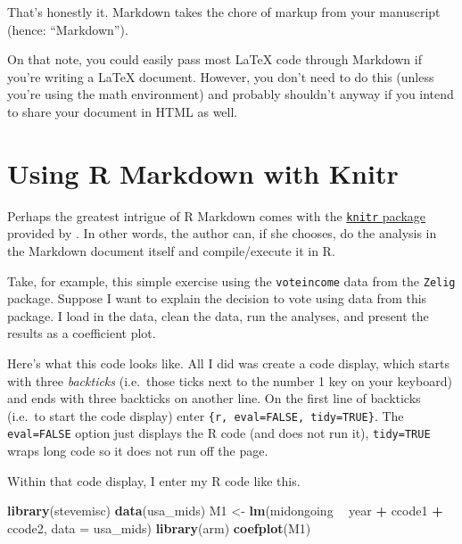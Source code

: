 \documentclass[11pt,]{article}
\newenvironment{Shaded}{\begin{snugshade}}{\end{snugshade}}
\newcommand{\DataTypeTok}[1]{\textcolor[rgb]{0.13,0.29,0.53}{#1}}
\newcommand{\KeywordTok}[1]{\textcolor[rgb]{0.13,0.29,0.53}{\textbf{#1}}}
\newcommand{\NormalTok}[1]{#1}
\newcommand{\OperatorTok}[1]{\textcolor[rgb]{0.81,0.36,0.00}{\textbf{#1}}}
\newcommand{\StringTok}[1]{\textcolor[rgb]{0.31,0.60,0.02}{#1}}
\begin{document}
That's honestly it. Markdown takes the chore of markup from your
manuscript (hence: ``Markdown'').

On that note, you could easily pass most LaTeX code through Markdown if
you're writing a LaTeX document. However, you don't need to do this
(unless you're using the math environment) and probably shouldn't anyway
if you intend to share your document in HTML as well.

\hypertarget{using-r-markdown-with-knitr}{%
\section{Using R Markdown with
Knitr}\label{using-r-markdown-with-knitr}}

Perhaps the greatest intrigue of R Markdown comes with the
\href{http://yihui.name/knitr/}{\texttt{knitr} package} provided by
\citet{xie2013ddrk}. In other words, the author can, if she chooses, do
the analysis in the Markdown document itself and compile/execute it in
R.

Take, for example, this simple exercise using the \texttt{voteincome}
data from the \texttt{Zelig} package. Suppose I want to explain the
decision to vote using data from this package. I load in the data, clean
the data, run the analyses, and present the results as a coefficient
plot.

Here's what this code looks like. All I did was create a code display,
which starts with three \emph{backticks} (i.e.~those ticks next to the
number 1 key on your keyboard) and ends with three backticks on another
line. On the first line of backticks (i.e.~to start the code display)
enter \texttt{\{r,\ eval=FALSE,\ tidy=TRUE\}}. The \texttt{eval=FALSE}
option just displays the R code (and does not run it),
\texttt{tidy=TRUE} wraps long code so it does not run off the page.

Within that code display, I enter my R code like this.

\begin{Shaded}
\begin{Highlighting}[]
\KeywordTok{library}\NormalTok{(stevemisc)}
\KeywordTok{data}\NormalTok{(usa_mids)}
\NormalTok{M1 <-}\StringTok{ }\KeywordTok{lm}\NormalTok{(midongoing }\OperatorTok{~}\StringTok{ }\NormalTok{year }\OperatorTok{+}\StringTok{ }\NormalTok{ccode1 }\OperatorTok{+}\StringTok{ }\NormalTok{ccode2, }\DataTypeTok{data =}\NormalTok{ usa_mids)}
\KeywordTok{library}\NormalTok{(arm)}
\KeywordTok{coefplot}\NormalTok{(M1)}
\end{Highlighting}
\end{Shaded}
\end{document}
